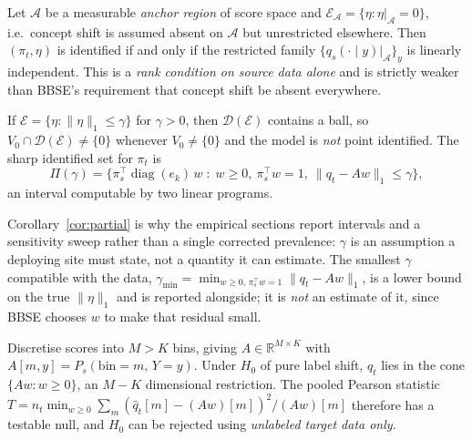 \begin{corollary}\label{cor:anchor}
Let $\mathcal{A}$ be a measurable \emph{anchor region} of score space and
$\mathcal{E}_{\mathcal{A}}=\{\eta:\eta|_{\mathcal{A}}=0\}$, i.e.\ concept shift
is assumed absent on $\mathcal{A}$ but unrestricted elsewhere.  Then
$(\pi_t,\eta)$ is identified if and only if the restricted family
$\{q_s(\cdot\mid y)|_{\mathcal{A}}\}_y$ is linearly independent.  This is a
\emph{rank condition on source data alone} and is strictly weaker than BBSE's
requirement that concept shift be absent everywhere.
\end{corollary}

\begin{corollary}\label{cor:partial}
If $\mathcal{E}=\{\eta:\|\eta\|_{1}\le\gamma\}$ for $\gamma>0$, then
$\mathcal{D}(\mathcal{E})$ contains a ball, so
$V_0\cap\mathcal{D}(\mathcal{E})\neq\{0\}$ whenever $V_0\neq\{0\}$ and the
model is \emph{not} point identified.  The sharp identified set for $\pi_t$ is
\[
  \Pi(\gamma)=\Big\{\pi_s^\top\! \operatorname{diag}(e_k)\,w \;:\;
     w\ge 0,\ \pi_s^\top w=1,\ \|q_t-Aw\|_1\le\gamma \Big\},
\]
an interval computable by two linear programs.
\end{corollary}

Corollary~\ref{cor:partial} is why the empirical sections report intervals and
a sensitivity sweep rather than a single corrected prevalence: $\gamma$ is an
assumption a deploying site must state, not a quantity it can estimate.  The
smallest $\gamma$ compatible with the data,
$\gamma_{\min}=\min_{w\ge0,\,\pi_s^\top w=1}\|q_t-Aw\|_1$, is a lower bound on
the true $\|\eta\|_1$ and is reported alongside; it is \emph{not} an estimate of
it, since BBSE chooses $w$ to make that residual small.

\begin{proposition}\label{prop:gof}
Discretise scores into $M>K$ bins, giving $A\in\mathbb{R}^{M\times K}$ with
$A[m,y]=P_s(\text{bin}=m,\,Y=y)$.  Under $H_0$ of pure label shift, $q_t$ lies
in the cone $\{Aw:w\ge0\}$, an $M-K$ dimensional restriction.  The pooled
Pearson statistic
$T=n_t\min_{w\ge0}\sum_m (\hat q_t[m]-(Aw)[m])^2/(Aw)[m]$
therefore has a testable null, and $H_0$ can be rejected using \emph{unlabeled
target data only}.
\end{proposition}

